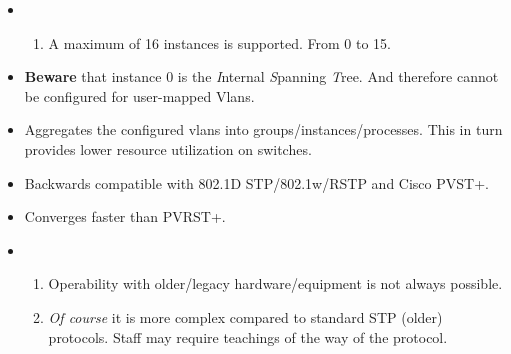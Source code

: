 \begin{itemize}
    \item {}
    \begin{enumerate}
        \item A maximum of 16 instances is supported. {\footnotesize From 0 to 15.}
    \end{enumerate}
    \item \textbf{Beware} that instance 0 is the \textit{I}nternal \textit{S}panning \textit{T}ree. And therefore cannot be configured for user-mapped Vlans.
    \item Aggregates the configured vlans into groups/instances/processes. This in turn provides lower resource utilization on switches. \dWinkey
    \item Backwards compatible with 802.1D STP/802.1w/RSTP and Cisco PVST+.
    \item Converges faster than PVRST+.
    \item {}
    \begin{enumerate}
        \item Operability with older/legacy hardware/equipment is not always possible.
        \item \textit{Of course} it is more complex compared to standard STP (older) protocols. {\footnotesize Staff may require teachings of the way of the protocol.}
    \end{enumerate}
\end{itemize}

\begin{table}[h]
    \centering
    \caption{MST Attributes}
    \label{mstattr}
\end{table}


